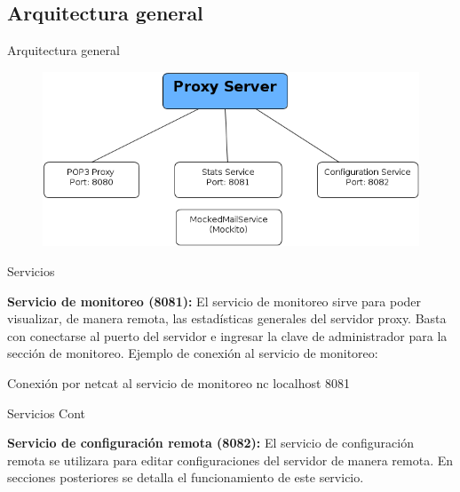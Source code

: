 \documentclass{beamer}
\begin{document}
\subsection{Arquitectura general}
\begin{frame}{Arquitectura general}
\begin{figure}[H]
\begin{center}
\includegraphics[scale=0.50]{images/Servers.png}
\label{modelado}
\end{center}
\end{figure}
\end{frame}


\begin{frame}{Servicios}

\par \textbf{Servicio de monitoreo (8081):} El servicio de monitoreo sirve para poder visualizar, de manera remota, las estadísticas generales del servidor proxy. Basta con conectarse al puerto del servidor e ingresar la clave de administrador para la sección de monitoreo. Ejemplo de conexión al servicio de monitoreo:

\begin{block}{Conexión por netcat al servicio de monitoreo}
nc localhost 8081
\end{block}

\end{frame}

\begin{frame}{Servicios Cont}

\par \textbf{Servicio de configuración remota (8082):} El servicio de configuración remota se utilizara para editar configuraciones del servidor de manera remota. En secciones posteriores se detalla el funcionamiento de este servicio.

\end{frame}
\end{document}
